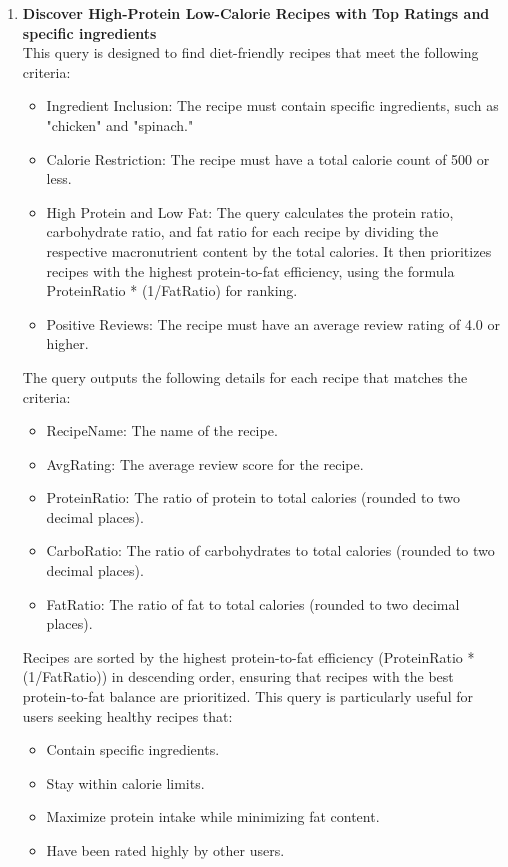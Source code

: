 \begin{enumerate}
    \clearpage
    \item \textbf{Discover High-Protein Low-Calorie Recipes with Top Ratings and specific ingredients}\\
    This query is designed to find diet-friendly recipes that meet the following criteria:
    \begin{itemize}
        \item Ingredient Inclusion: The recipe must contain specific ingredients, such as "chicken" and "spinach."
        \item Calorie Restriction: The recipe must have a total calorie count of 500 or less.
        \item  High Protein and Low Fat:
The query calculates the protein ratio, carbohydrate ratio, and fat ratio for each recipe by dividing the respective macronutrient content by the total calories.
It then prioritizes recipes with the highest protein-to-fat efficiency, using the formula ProteinRatio * (1/FatRatio) for ranking.
        \item Positive Reviews: The recipe must have an average review rating of 4.0 or higher.
    \end{itemize}
The query outputs the following details for each recipe that matches the criteria:
\begin{itemize}
    \item RecipeName: The name of the recipe.
    \item AvgRating: The average review score for the recipe.
    \item ProteinRatio: The ratio of protein to total calories (rounded to two decimal places).
    \item CarboRatio: The ratio of carbohydrates to total calories (rounded to two decimal places).
    \item FatRatio: The ratio of fat to total calories (rounded to two decimal places).
\end{itemize}
Recipes are sorted by the highest protein-to-fat efficiency (ProteinRatio * (1/FatRatio)) in descending order, ensuring that recipes with the best protein-to-fat balance are prioritized.
This query is particularly useful for users seeking healthy recipes that:
\begin{itemize}
    \item Contain specific ingredients.
    \item Stay within calorie limits.
    \item Maximize protein intake while minimizing fat content.
    \item Have been rated highly by other users.
\end{itemize}

\end{enumerate}
